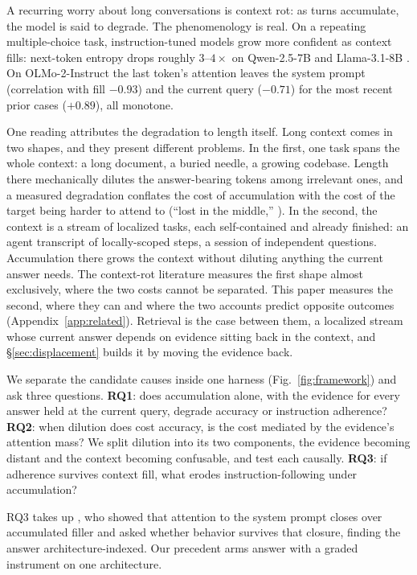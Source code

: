 \documentclass{article}
\begin{document}
A recurring worry about long conversations is context rot: as turns accumulate, the model
is said to degrade. The phenomenology is real. On a repeating multiple-choice task,
instruction-tuned models grow more confident as context fills: next-token entropy
drops roughly $3$--$4\times$ on Qwen-2.5-7B \citep{qwen2025} and Llama-3.1-8B
\citep{llama3herd}. On OLMo-2-Instruct the last token's attention leaves
the system prompt (correlation with fill $-0.93$) and the current query ($-0.71$) for the most
recent prior cases ($+0.89$), all monotone.

One reading attributes the degradation to length itself. Long context comes in two shapes,
and they present different problems. In the first, one task spans the whole context: a
long document, a buried needle, a growing codebase. Length there mechanically dilutes
the answer-bearing tokens among irrelevant ones, and a measured degradation conflates the cost
of accumulation with the cost of the target being harder to attend to (``lost in the middle,''
\citealp{liu2023lost}). In the second, the context is a stream of localized tasks, each
self-contained and already finished: an agent transcript of locally-scoped steps, a session of
independent questions. Accumulation there grows the context without diluting anything the
current answer needs. The context-rot literature measures the first shape almost exclusively, where the two costs
cannot be separated. This paper measures the second, where they can and where the two accounts
predict opposite outcomes (Appendix~\ref{app:related}). Retrieval is the case between them, a
localized stream whose current answer depends on evidence sitting back in the context, and
\S\ref{sec:displacement} builds it by moving the evidence back.

We separate the candidate causes inside one harness (Fig.~\ref{fig:framework}) and ask three
questions. \textbf{RQ1}: does accumulation alone, with the evidence for every answer held at
the current query, degrade accuracy or instruction adherence? \textbf{RQ2}: when dilution does
cost accuracy, is the cost mediated by the evidence's attention mass? We split dilution into
its two components, the evidence becoming distant and the context becoming
confusable, and test each causally. \textbf{RQ3}: if adherence survives context fill,
what erodes instruction-following under accumulation?

RQ3 takes up \citet{dongre2026attentioncloses}, who showed that attention to the system prompt
closes over accumulated filler and asked whether behavior survives that closure, finding the
answer architecture-indexed. Our precedent arms answer with a graded instrument on one
architecture.
\end{document}
